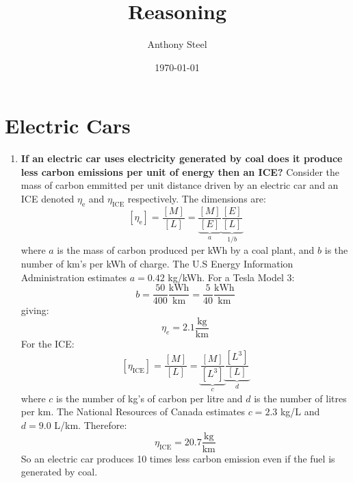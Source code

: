 \documentclass[9pt]{report}
\begin{document}
\title{Reasoning}
\author{Anthony Steel}
\date{\today}
\maketitle
\chapter{Electric Cars}
\begin{enumerate}
  \item \textbf{If an electric car uses electricity generated by coal does it
    produce less carbon emissions per unit of energy then an ICE?}
    Consider the mass of carbon emmitted per unit distance driven by an
    electric car and an ICE denoted $\eta_\text{e}$ and $\eta_\text{ICE}$
    respectively. The dimensions are:
    \[
      [\eta_\text{e}] = \frac{[M]}{[L]} = \underbrace{\frac{[M]}{[E]}}_{a} \underbrace{\frac{[E]}{[L]}}_{1/b}
    \]
    where $a$ is the mass of carbon produced per kWh by a coal plant, and $b$
    is the number of km's per kWh of charge. The U.S Energy Information Administration
    estimates $a = 0.42$ kg/kWh. For a Tesla Model 3:
    \[
      b = \frac{50}{400} \frac{\text{kWh}}{\text{km}} = \frac{5}{40}\frac{\text{kWh}}{\text{km}}
    \]
    giving:
    \[
      \eta_e = 2.1 \frac{\text{kg}}{\text{km}}
    \]
    For the ICE:
    \[
      [\eta_\text{ICE}] = \frac{[M]}{[L]} = \underbrace{\frac{[M]}{[L^3]}}_{c} \underbrace{\frac{[L^3]}{[L]}}_{d}
    \]
    where $c$ is the number of kg's of carbon per litre and $d$ is the number of litres per km.
    The National Resources of Canada estimates $c = 2.3$ kg/L and $d = 9.0$ L/km. Therefore:
    \[
      \eta_\text{ICE} = 20.7 \frac{\text{kg}}{\text{km}}
    \]
    So an electric car produces 10 times less carbon emission even if the fuel is
    generated by coal.
\end{enumerate}
\end{document}
